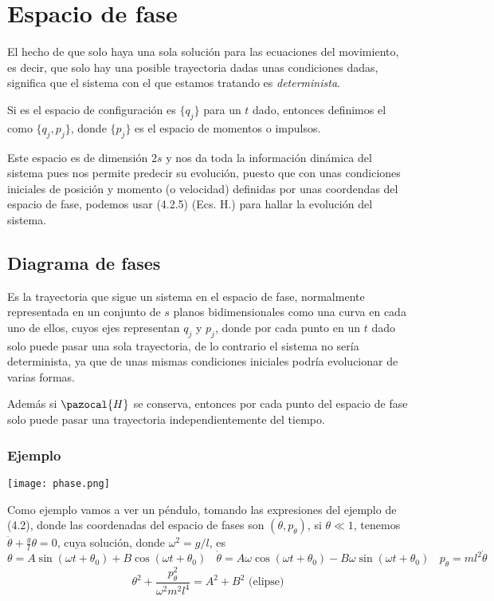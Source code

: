 \section{Espacio de fase} 
El hecho de que solo haya una sola solución para las ecuaciones del movimiento, es decir, que solo hay una posible trayectoria dadas unas condiciones dadas, significa que el sistema con el que estamos tratando es \textit{determinista}.

Si es el espacio de configuración es $\{q_j\}$ para un $t$ dado, entonces definimos el  como $\{q_j,p_j\}$, donde $\{p_j\}$ es el espacio de momentos o impulsos.

Este espacio es de dimensión $2s$ y nos da toda la información dinámica del sistema pues nos permite predecir su evolución, puesto que con unas condiciones iniciales de posición y momento (o velocidad) definidas por unas coordendas del espacio de fase, podemos usar (4.2.5) (Ecs. H.) para hallar la evolución del sistema.
\subsection{Diagrama de fases}
Es la trayectoria que sigue un sistema en el espacio de fase, normalmente representada en un conjunto de $s$ planos bidimensionales como una curva en cada uno de ellos, cuyos ejes representan $q_j$ y $p_j$, donde por cada punto en un $t$ dado solo puede pasar una sola trayectoria, de lo contrario el sistema no sería determinista, ya que de unas mismas condiciones iniciales podría evolucionar de varias formas.

Además si $\pazocal{H}$ se conserva, entonces por cada punto del espacio de fase solo puede pasar una trayectoria independientemente del tiempo.

\subsubsection{Ejemplo}
\begin{marginfigure}[0cm]
	\texttt{[image: phase.png]}
\end{marginfigure}
Como ejemplo vamos a ver un péndulo, tomando las expresiones del ejemplo de (4.2), donde las coordenadas del espacio de fases son $(\theta,p_\theta)$, si $\theta \ll 1$, tenemos $\ddot{\theta}+\frac{g}{l}\theta=0$, cuya solución, donde $\omega^2=g/l$, es
\[\theta = A \sin{(\omega t + \theta_0)}+ B \cos{(\omega t + \theta_0)} \ \ \ \ \dot{\theta} = A\omega \cos{(\omega t + \theta_0)}- B \omega \sin{(\omega t + \theta_0)} \ \ \ \ p_\theta = ml^2 \dot{\theta}\]
\[\theta^2 + \frac{p_\theta^2}{\omega^2 m^2l^4}=A^2+B^2 \mbox{ (elipse)}\]
